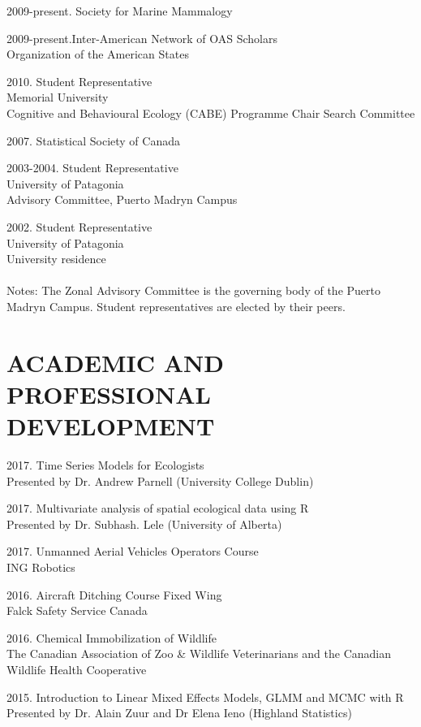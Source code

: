 \documentclass{res}
\begin{document}
\begin{resume}
\begin{hangparas}{.4in}{1}
2009-present. Society for Marine Mammalogy    

2009-present.Inter-American Network of OAS Scholars     \\
Organization of the American States

2010. Student Representative\\
Memorial University\\
Cognitive and Behavioural Ecology (CABE) Programme Chair Search Committee

2007. Statistical Society of Canada

2003-2004. Student Representative\\
University of Patagonia\\
Advisory Committee, Puerto Madryn Campus

2002. Student Representative\\
University of Patagonia\\
University residence\\~\\
Notes: The Zonal Advisory Committee is the governing body of the Puerto Madryn Campus. 
Student representatives are elected by their peers.


\end{hangparas}
\section{ACADEMIC AND PROFESSIONAL DEVELOPMENT}
\vspace{0.2in}
\begin{hangparas}{.4in}{1}
2017. Time Series Models for Ecologists\\ 
Presented by Dr. Andrew Parnell (University College Dublin)

2017. Multivariate analysis of spatial ecological data using R\\
Presented by Dr. Subhash. Lele (University of Alberta)

2017. Unmanned Aerial Vehicles Operators Course\\ 
ING Robotics
\pagebreak

2016. Aircraft Ditching Course Fixed Wing \\
Falck Safety Service Canada

2016. Chemical Immobilization of Wildlife\\
The Canadian Association of Zoo \& Wildlife Veterinarians and the Canadian Wildlife Health Cooperative

2015. Introduction to Linear Mixed Effects Models, GLMM and MCMC with R\\
Presented by Dr. Alain Zuur and Dr Elena Ieno (Highland Statistics)


\end{hangparas}
\end{resume}
\end{document}
